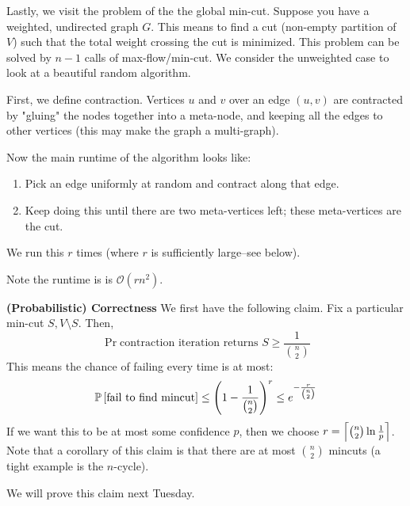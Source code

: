 Lastly, we visit the problem of the the global min-cut. Suppose you have a weighted, undirected graph $G$. This means to find a cut (non-empty partition of $V$) such that the total weight crossing the cut is minimized.
This problem can be solved by $n - 1$ calls of max-flow/min-cut. We consider the unweighted case to look at a beautiful random algorithm.

\begin{algothm}
    First, we define contraction. Vertices $u$ and $v$ over an edge $(u, v)$ are contracted by "gluing" the nodes together into a meta-node, and keeping all the edges to other vertices (this may make the graph a multi-graph).

    Now the main runtime of the algorithm looks like:
    \begin{enumerate}
        \item Pick an edge uniformly at random and contract along that edge.
        \item Keep doing this until there are two meta-vertices left; these meta-vertices are the cut.
    \end{enumerate}
    We run this $r$ times (where $r$ is sufficiently large--see below).
    
    Note the runtime is is $\mathcal{O}(rn^2)$.

    \textbf{(Probabilistic) Correctness}
    We first have the following claim. Fix a particular min-cut $S, V \setminus S$. Then,
    \[ \Pr{\text{contraction iteration returns $S$}} \geq \frac{1}{\binom{n}{2}} \]
    This means the chance of failing every time is at most:
    \[ \mathbb{P}\left[ \text{fail to find mincut} \right] \leq \qty(1 - \frac{1}{\binom{n}{2}})^r \leq e^{-\frac{r}{\binom{n}{2}}}\]
    If we want this to be at most some confidence $p$, then we choose $r = \left\lceil \binom{n}{2} \ln \frac{1}{p} \right\rceil$.
    Note that a corollary of this claim is that there are at most $\binom{n}{2}$ mincuts (a tight example is the $n$-cycle).

    We will prove this claim next Tuesday.
\end{algothm}

